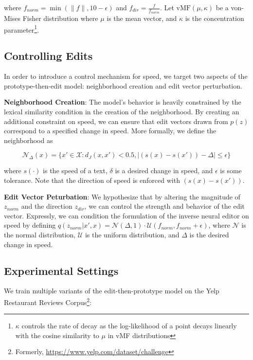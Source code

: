where $f_{norm} = \min(\|f\|, 10 - \epsilon)$ and $f_{dir} = \frac{f}{f_{norm}}$. Let $\text{vMF}(\mu, \kappa)$ be a von-Mises Fisher distribution where $\mu$ is the mean vector, and $\kappa$ is the concentration parameter\footnote{$\kappa$ controls the rate of decay as the log-likelihood of a point decays linearly with the cosine similarity to $\mu$ in vMF distributions}.

\subsection{Controlling Edits}
\label{subsec:ne_methodology}

In order to introduce a control mechanism for speed, we target two aspects of the prototype-then-edit model: neighborhood creation and edit vector perturbation.

\textbf{Neighborhood Creation}: The model's behavior is heavily constrained by the lexical similarity condition in the creation of the neighborhood. By creating an additional constraint on speed, we can ensure that edit vectors drawn from $p(z)$ correspond to a specified change in speed. More formally, we define the neighborhood as

\begin{equation}
\mathcal{N}_{\Delta}(x) = \{x' \in \mathcal{X} : d_J(x, x') < 0.5, |(s(x) - s(x')) - \Delta| \leq \epsilon \}
\end{equation}

where $s(\cdot)$ is the speed of a text, $\delta$ is a desired change in speed, and $\epsilon$ is some tolerance. Note that the direction of speed is enforced with $(s(x) - s(x'))$.

\textbf{Edit Vector Peturbation}: We hypothesize that by altering the magnitude of $z_{norm}$ and the direction $z_{dir}$, we can control the strength and behavior of the edit vector. Expressly, we can condition the formulation of the inverse neural editor on speed by defining $q(z_{norm} | x', x) = \mathcal{N}(\Delta, 1) \cdot \mathcal{U}(f_{norm}, f_{norm} + \epsilon)$, where $\mathcal{N}$ is the normal distribution, $\mathcal{U}$ is the uniform distribution, and $\Delta$ is the desired change in speed.

\subsection{Experimental Settings}
\label{subsec:ne_exp_settings}

We train multiple variants of the edit-then-prototype model on the Yelp Restaurant Reviews Corpus\footnote{Formerly, \url{https://www.yelp.com/dataset/challenge}}:


